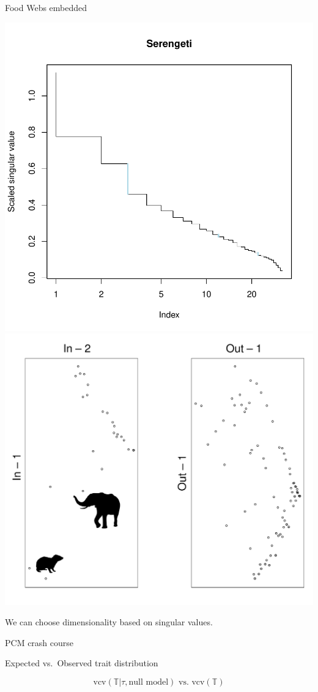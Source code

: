 \documentclass[]{beamer}
\begin{document}
\begin{frame}{Food Webs embedded}

\centering
  \includegraphics[width=0.4\linewidth]{images/Serengeti_svds.pdf}
  \includegraphics[width=0.6\linewidth]{images/Serengeti_Traits.pdf}

\centering
{\tiny We can choose dimensionality based on singular values.}
 
\end{frame}

\begin{frame}{PCM crash course}

\centering
Expected vs.~Observed trait distribution

  \begin{equation*}
    \textrm{vcv}\left(  \mathbb{T} | \tau, \mbox{null model} \right) \mbox{ vs. } \textrm{vcv}\left( \mathbb{T}\right)
  \end{equation*}

\end{frame}
\end{document}
